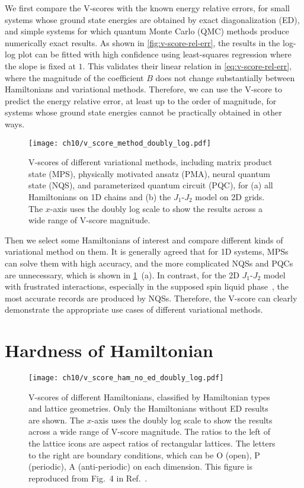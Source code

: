 We first compare the V-scores with the known energy relative errors, for small systems whose ground state energies are obtained by exact diagonalization (ED), and simple systems for which quantum Monte Carlo (QMC) methods produce numerically exact results. As shown in \cref{fig:v-score-rel-err}, the results in the log-log plot can be fitted with high confidence using least-squares regression where the slope is fixed at $1$. This validates their linear relation in \cref{eq:v-score-rel-err}, where the magnitude of the coefficient $B$ does not change substantially between Hamiltonians and variational methods. Therefore, we can use the V-score to predict the energy relative error, at least up to the order of magnitude, for systems whose ground state energies cannot be practically obtained in other ways.

\begin{figure}[htb]
\centering
\texttt{[image: ch10/v\_score\_method\_doubly\_log.pdf]}
\caption[V-scores of different variational methods]{
V-scores of different variational methods, including matrix product state (MPS), physically motivated ansatz (PMA), neural quantum state (NQS), and parameterized quantum circuit (PQC), for (a) all Hamiltonians on 1D chains and (b) the $J_1$-$J_2$ model on 2D grids.
The $x$-axis uses the doubly log scale to show the results across a wide range of V-score magnitude.
}
\label{fig:v-score-method}
\end{figure}

Then we select some Hamiltonians of interest and compare different kinds of variational method on them. It is generally agreed that for 1D systems, MPSs can solve them with high accuracy, and the more complicated NQSs and PQCs are unnecessary, which is shown in \cref{fig:v-score-method}~(a). In contrast, for the 2D $J_1$-$J_2$ model with frustrated interactions, especially in the supposed spin liquid phase~\cite{dagotto1989phase, schulz1996magnetic, hu2013direct, liang2018solving, liu2018gapless, choo2019two, nomura2021dirac}, the most accurate records are produced by NQSs. Therefore, the V-score can clearly demonstrate the appropriate use cases of different variational methods.

\section{Hardness of Hamiltonian}

\begin{figure}[htb]
\centering
\texttt{[image: ch10/v\_score\_ham\_no\_ed\_doubly\_log.pdf]}
\caption[V-scores of different Hamiltonians]{
V-scores of different Hamiltonians, classified by Hamiltonian types and lattice geometries.
Only the Hamiltonians without ED results are shown.
The $x$-axis uses the doubly log scale to show the results across a wide range of V-score magnitude.
The ratios to the left of the lattice icons are aspect ratios of rectangular lattices. The letters to the right are boundary conditions, which can be O (open), P (periodic), A (anti-periodic) on each dimension.
This figure is reproduced from Fig.~4 in Ref.~\cite{wu2024variational}.
}
\label{fig:v-score-ham}
\end{figure}


